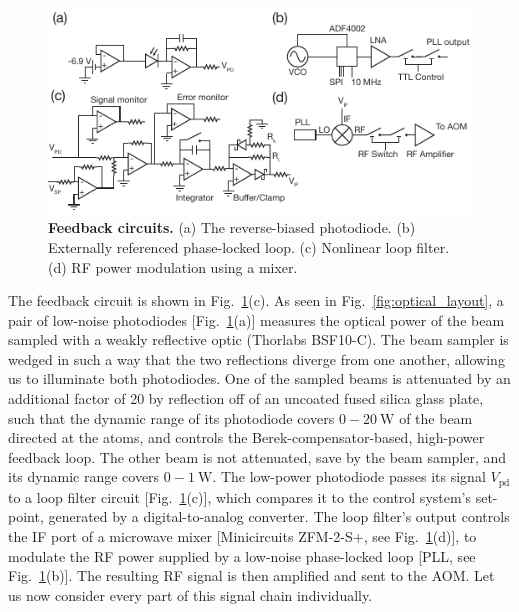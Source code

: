 \documentclass[twocolumn,aip,rsi,reprint,bibnotes]{revtex4-1}
\newcommand\unit[2]{\ensuremath{#1~\mathrm{{#2}}}}
\begin{document}
\begin{figure}
  \begin{center}
    \includegraphics{Figure6.pdf}
    \caption{\textbf{Feedback circuits.} (a) The reverse-biased photodiode. (b) Externally referenced phase-locked loop. (c) Nonlinear loop filter. (d) RF power modulation using a mixer.}\label{fig:circuits}
  \end{center}
\end{figure}
The feedback circuit is shown in Fig.~\ref{fig:circuits}(c). As seen in Fig.~\ref{fig:optical_layout}, a pair of low-noise photodiodes [Fig.~\ref{fig:circuits}(a)] measures the optical power of the beam sampled with a weakly reflective optic (Thorlabs BSF10-C).
The beam sampler is wedged in such a way that the two reflections diverge from one another, allowing us to illuminate both photodiodes.
One of the sampled beams is attenuated by an additional factor of 20 by reflection off of an uncoated fused silica glass plate, such that the dynamic range of its photodiode covers \unit{0-20}{W} of the beam directed at the atoms, and controls the Berek-compensator-based, high-power feedback loop.
The other beam is not attenuated, save by the beam sampler, and its dynamic range covers \unit{0-1}{W}.
The low-power photodiode passes its signal $V_{\mathrm{pd}}$ to a loop filter circuit [Fig.~\ref{fig:circuits}(c)], which compares it to the control system's set-point, generated by a digital-to-analog converter.
The loop filter's output controls the IF port of a microwave mixer [Minicircuits ZFM-2-S+, see Fig.~\ref{fig:circuits}(d)], to modulate the RF power supplied by a low-noise phase-locked loop [PLL, see Fig.~\ref{fig:circuits}(b)].
The resulting RF signal is then amplified and sent to the AOM.
Let us now consider every part of this signal chain individually.
\end{document}
